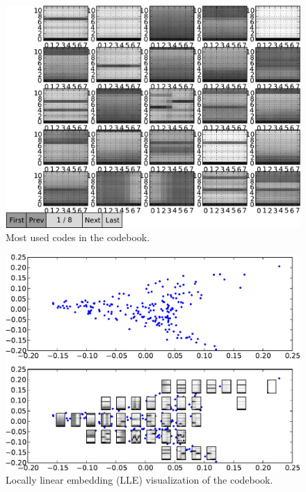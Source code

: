\documentclass{article}
\begin{document}
\begin{figure}[htb]
\begin{center}
\includegraphics[width=.9\columnwidth]{codes1}
\end{center}
\caption{\small{Most used codes in the codebook.}}
\label{fig:codes1}
\end{figure}

\begin{figure}[htb]
\begin{center}
\includegraphics[width=.9\columnwidth]{codes_lle}
\end{center}
\caption{\small{Locally linear embedding (LLE) visualization of the codebook.}}
\label{fig:lle}
\end{figure}
\end{document}
